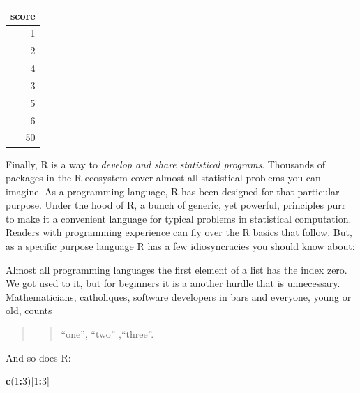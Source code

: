 \documentclass[]{svmono}
\newenvironment{Shaded}{\begin{snugshade}}{\end{snugshade}}
\newcommand{\KeywordTok}[1]{\textcolor[rgb]{0.13,0.29,0.53}{\textbf{#1}}}
\newcommand{\DataTypeTok}[1]{\textcolor[rgb]{0.13,0.29,0.53}{#1}}
\newcommand{\DecValTok}[1]{\textcolor[rgb]{0.00,0.00,0.81}{#1}}
\newcommand{\StringTok}[1]{\textcolor[rgb]{0.31,0.60,0.02}{#1}}
\newcommand{\OperatorTok}[1]{\textcolor[rgb]{0.81,0.36,0.00}{\textbf{#1}}}
\newcommand{\NormalTok}[1]{#1}
\theoremstyle{definition}
\theoremstyle{definition}
\theoremstyle{definition}
\theoremstyle{remark}
\begin{document}
\begin{Shaded}
\end{Shaded}

\begin{tabular}{r}
\hline
score\\
\hline
1\\
\hline
2\\
\hline
4\\
\hline
3\\
\hline
5\\
\hline
6\\
\hline
50\\
\hline
\end{tabular}

Finally, R is a way to \emph{develop and share statistical programs}.
Thousands of packages in the R ecosystem cover almost all statistical
problems you can imagine. As a programming language, R has been designed
for that particular purpose. Under the hood of R, a bunch of generic,
yet powerful, principles purr to make it a convenient language for
typical problems in statistical computation. Readers with programming
experience can fly over the R basics that follow. But, as a specific
purpose language R has a few idiosyncracies you should know about:

Almost all programming languages the first element of a list has the
index zero. We got used to it, but for beginners it is a another hurdle
that is unnecessary. Mathematicians, catholiques, software developers in
bars and everyone, young or old, counts

\begin{quote}
\begin{quote}
``one'', ``two'' ,``three''.
\end{quote}
\end{quote}

And so does R:

\begin{Shaded}
\begin{Highlighting}[]
\KeywordTok{c}\NormalTok{(}\DecValTok{1}\OperatorTok{:}\DecValTok{3}\NormalTok{)[}\DecValTok{1}\OperatorTok{:}\DecValTok{3}\NormalTok{]}
\end{Highlighting}
\end{Shaded}
\end{document}
